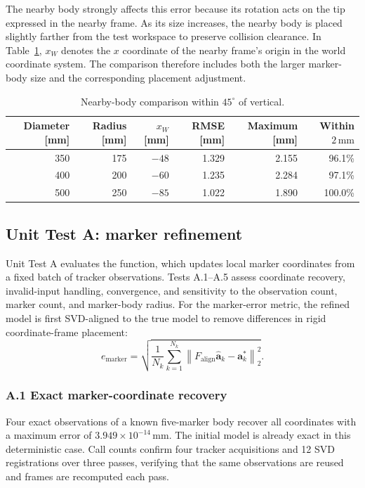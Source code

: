 \documentclass[11pt]{article}
\newcommand{\vct}[1]{\bm{#1}}
\newcommand{\norm}[1]{\left\|#1\right\|_2}
\begin{document}
The nearby body strongly affects this error because its rotation acts on the
tip expressed in the nearby frame.  As its size increases, the nearby body is
placed slightly farther from the test workspace to preserve collision
clearance.  In Table~\ref{tab:validation-near-comparison}, $x_W$ denotes the
$x$ coordinate of the nearby frame's origin in the world coordinate system.
The comparison therefore includes both the larger marker-body size and the
corresponding placement adjustment.

\begin{table}[H]
\centering
\footnotesize
\caption{Nearby-body comparison within $45^\circ$ of vertical.}
\label{tab:validation-near-comparison}
\begin{tabular}{rrrrrr}
\toprule
Diameter [mm] & Radius [mm] & $x_W$ [mm] & RMSE [mm] & Maximum [mm] & Within $2\,\mathrm{mm}$ \\
\midrule
350 & 175 & $-48$ & 1.329 & 2.155 & 96.1\% \\
400 & 200 & $-60$ & 1.235 & 2.284 & 97.1\% \\
500 & 250 & $-85$ & 1.022 & 1.890 & 100.0\% \\
\bottomrule
\end{tabular}
\end{table}

\subsection{Unit Test A: marker refinement}
Unit Test A evaluates the  function, which updates
local marker coordinates from a fixed batch of tracker observations.  Tests
A.1--A.5 assess coordinate recovery, invalid-input handling, convergence, and
sensitivity to the observation count, marker count, and marker-body radius.
For the marker-error metric, the refined model is first SVD-aligned to the true
model to remove differences in rigid coordinate-frame placement:
\begin{equation}
e_{\mathrm{marker}}
=\sqrt{\frac{1}{N_k}\sum_{k=1}^{N_k}
\norm{F_{\mathrm{align}}\widehat{\vct a}_k-\vct a_k^*}^2}.
\end{equation}

\subsubsection*{A.1 Exact marker-coordinate recovery}
Four exact observations of a known five-marker body recover all coordinates
with a maximum error of $3.949\times10^{-14}\,\mathrm{mm}$.  The initial model
is already exact in this deterministic case.  Call counts confirm four tracker
acquisitions and 12 SVD registrations over three passes, verifying that the
same observations are reused and frames are recomputed each pass.
\end{document}
